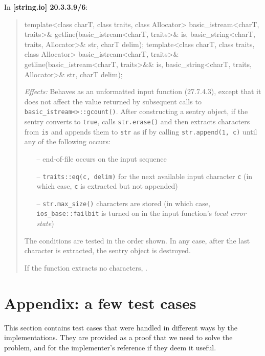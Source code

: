 \documentclass{wg21}
\begin{document}
In \textbf{[string.io] 20.3.3.9/6}:
\begin{quote}
\begin{codeblock}
template<class charT, class traits, class Allocator>
basic_istream<charT, traits>&
  getline(basic_istream<charT, traits>& is,
          basic_string<charT, traits, Allocator>& str,
          charT delim);
template<class charT, class traits, class Allocator>
basic_istream<charT, traits>&
  getline(basic_istream<charT, traits>&& is,
          basic_string<charT, traits, Allocator>& str,
          charT delim);
\end{codeblock}
\textit{Effects:} Behaves as an unformatted input function (27.7.4.3), except
that it does not affect the value returned by subsequent calls to \texttt{basic_istream<>::gcount()}.
After constructing a sentry object, if the sentry converts to \texttt{true},
calls \texttt{str.erase()} and then extracts characters from \texttt{is} and
appends them to \texttt{str} as if by calling \texttt{str.append(1, c)} until
any of the following occurs:
\begin{itemize}
  \item[--] end-of-file occurs on the input sequence\added{;}
  \item[--] \texttt{traits::eq(c, delim)} for the next available input character
            \texttt{c} (in which case, \texttt{c} is extracted but not appended)
  \item[--] \texttt{str.max_size()} characters are stored (in which case,
            {\texttt{ios_base::failbit} is turned on in the input function's \textit{local error state}})
\end{itemize}
The conditions are tested in the order shown. In any case, after the last
character is extracted, the sentry object is destroyed.

If the function extracts no characters, .
\end{quote}


\section{Appendix: a few test cases}
This section contains test cases that were handled in different ways by the
implementations. They are provided as a proof that we need to solve the problem,
and for the implementer's reference if they deem it useful.
\end{document}
